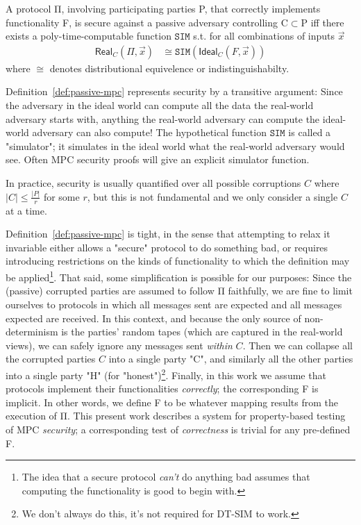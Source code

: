 \documentclass[compsoc, conference, a4paper, 10pt, times]{IEEEtran}
\newcommand{\toolname}{\textsc{DT-SIM}\xspace}
\begin{document}
\begin{definition}\label{def:passive-mpc}
    A protocol Π,
    involving participating parties P,
    that correctly implements functionality F,
    is secure against a passive adversary controlling C$\subset$P iff
    there exists a poly-time-computable function $\mathtt{SIM}$ s.t.
    for all combinations of inputs $\vec{x}$
    $$\begin{aligned}
        \mathsf{Real}_C(Π, \vec{x}) &\cong \mathtt{SIM}(\mathsf{Ideal}_C(F,\vec{x}))
    \end{aligned}$$
    where $\cong$ denotes distributional equivelence or indistinguishabilty.
\end{definition}

Definition~\ref{def:passive-mpc} represents security by a transitive argument:
Since the adversary in the ideal world can compute all the data the real-world adversary starts with,
anything the real-world adversary can compute the ideal-world adversary can also compute!
The hypothetical function $\mathtt{SIM}$ is called a "simulator";
it simulates in the ideal world what the real-world adversary would see.
Often MPC security proofs will give an explicit simulator function.

In practice, security is usually quantified over all possible corruptions $C$
where $\lvert C \rvert \leq \frac{\lvert P \rvert}{r}$ for some $r$, but this is not fundamental and we only consider a single $C$ at a time.

Definition~\ref{def:passive-mpc} is tight, in the sense that attempting to relax it invariable either
allows a "secure" protocol to do something bad, or requires introducing restrictions
on the kinds of functionality to which the definition may be applied\footnote{
    The idea that a secure protocol \textit{can't} do anything bad assumes that computing the functionality is good to begin with.
}.
That said, some simplification is possible for our purposes:
Since the (passive) corrupted parties are assumed to follow Π faithfully, we are fine to limit ourselves to
 protocols in which all messages sent are expected and all messages expected are received.
In this context, and because the only source of non-determinism is the parties' random tapes
(which are captured in the real-world views),
we can safely ignore any messages sent \textit{within} $C$.
Then we can collapse all the corrupted parties $C$ into a single party "C",
and similarly all the other parties into a single party "H" (for "honest")\footnote{
    We don't always do this, it's not required for \toolname to work.
}.
Finally, in this work we assume that protocols implement their functionalities \textit{correctly};
the corresponding F is implicit.
In other words, we define F to be whatever mapping results from the execution of Π.
This present work describes a system for property-based testing of MPC \textit{security};
a corresponding test of \textit{correctness} is trivial for any pre-defined F.
\end{document}
